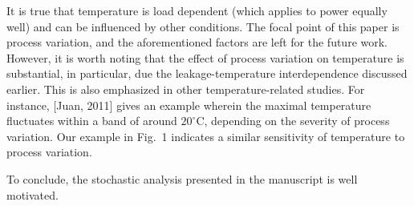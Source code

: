 \begin{authors}
It is true that temperature is load dependent (which applies to power equally well) and can be influenced by other conditions.
The focal point of this paper is process variation, and the aforementioned factors are left for the future work.
However, it is worth noting that the effect of process variation on temperature is substantial, in particular, due the leakage-temperature interdependence discussed earlier.
This is also emphasized in other temperature-related studies.
For instance, [Juan, 2011] gives an example wherein the maximal temperature fluctuates within a band of around $20^\circ$C, depending on the severity of process variation.
Our example in Fig.~1 indicates a similar sensitivity of temperature to process variation.

To conclude, the stochastic analysis presented in the manuscript is well motivated.


\end{authors}

